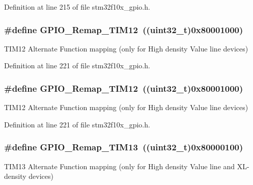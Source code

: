 Definition at line 215 of file stm32f10x\+\_\+gpio.\+h.

\subsubsection[{\texorpdfstring{G\+P\+I\+O\+\_\+\+Remap\+\_\+\+T\+I\+M12}{GPIO_Remap_TIM12}}]{\setlength{\rightskip}{0pt plus 5cm}\#define G\+P\+I\+O\+\_\+\+Remap\+\_\+\+T\+I\+M12~(({\bf uint32\+\_\+t})0x80001000)}\hypertarget{group___g_p_i_o___remap__define_ga44d3d86a684f62f9142d34ea5975a637}{}\label{group___g_p_i_o___remap__define_ga44d3d86a684f62f9142d34ea5975a637}
T\+I\+M12 Alternate Function mapping (only for High density Value line devices) 

Definition at line 221 of file stm32f10x\+\_\+gpio.\+h.

\subsubsection[{\texorpdfstring{G\+P\+I\+O\+\_\+\+Remap\+\_\+\+T\+I\+M12}{GPIO_Remap_TIM12}}]{\setlength{\rightskip}{0pt plus 5cm}\#define G\+P\+I\+O\+\_\+\+Remap\+\_\+\+T\+I\+M12~(({\bf uint32\+\_\+t})0x80001000)}\hypertarget{group___g_p_i_o___remap__define_ga44d3d86a684f62f9142d34ea5975a637}{}\label{group___g_p_i_o___remap__define_ga44d3d86a684f62f9142d34ea5975a637}
T\+I\+M12 Alternate Function mapping (only for High density Value line devices) 

Definition at line 221 of file stm32f10x\+\_\+gpio.\+h.

\subsubsection[{\texorpdfstring{G\+P\+I\+O\+\_\+\+Remap\+\_\+\+T\+I\+M13}{GPIO_Remap_TIM13}}]{\setlength{\rightskip}{0pt plus 5cm}\#define G\+P\+I\+O\+\_\+\+Remap\+\_\+\+T\+I\+M13~(({\bf uint32\+\_\+t})0x80000100)}\hypertarget{group___g_p_i_o___remap__define_ga72f5da86ed94f3be978cd841f7cd37cb}{}\label{group___g_p_i_o___remap__define_ga72f5da86ed94f3be978cd841f7cd37cb}
T\+I\+M13 Alternate Function mapping (only for High density Value line and X\+L-\/density devices) 

